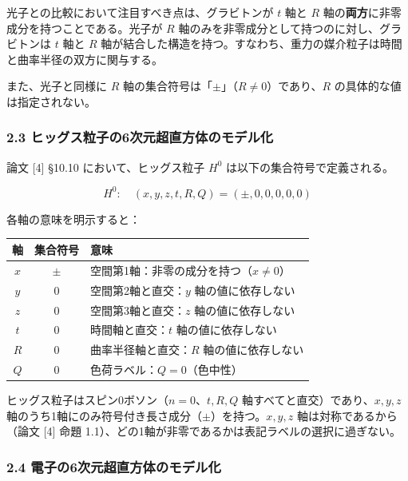 \documentclass[
  a4paper,11pt]{ltjsarticle}
\newcounter{none}
\theoremstyle{definition}
\theoremstyle{remark}
\begin{document}
光子との比較において注目すべき点は、グラビトンが \(t\) 軸と \(R\)
軸の\textbf{両方}に非零成分を持つことである。光子が \(R\)
軸のみを非零成分として持つのに対し、グラビトンは \(t\) 軸と \(R\)
軸が結合した構造を持つ。すなわち、重力の媒介粒子は時間と曲率半径の双方に関与する。

また、光子と同様に \(R\)
軸の集合符号は「\(\pm\)」（\(R \neq 0\)）であり、\(R\)
の具体的な値は指定されない。

\subsubsection{2.3
ヒッグス粒子の6次元超直方体のモデル化}\label{ux30d2ux30c3ux30b0ux30b9ux7c92ux5b50ux306e6ux6b21ux5143ux8d85ux76f4ux65b9ux4f53ux306eux30e2ux30c7ux30ebux5316}

論文 {[}4{]} §10.10 において、ヒッグス粒子 \(H^0\)
は以下の集合符号で定義される。

\[H^0: \quad (x, y, z, t, R, Q) = (\pm, 0, 0, 0, 0, 0)\]

各軸の意味を明示すると：

{\def\LTcaptype{none} %
\begin{longtable}[]{@{}ccl@{}}
\toprule\noalign{}
軸 & 集合符号 & 意味 \\
\midrule\noalign{}
\endhead
\bottomrule\noalign{}
\endlastfoot
\(x\) & \(\pm\) & 空間第1軸：非零の成分を持つ（\(x \neq 0\)） \\
\(y\) & \(0\) & 空間第2軸と直交：\(y\) 軸の値に依存しない \\
\(z\) & \(0\) & 空間第3軸と直交：\(z\) 軸の値に依存しない \\
\(t\) & \(0\) & 時間軸と直交：\(t\) 軸の値に依存しない \\
\(R\) & \(0\) & 曲率半径軸と直交：\(R\) 軸の値に依存しない \\
\(Q\) & \(0\) & 色荷ラベル：\(Q = 0\)（色中性） \\
\end{longtable}
}

ヒッグス粒子はスピン0ボソン（\(n = 0\)、\(t, R, Q\)
軸すべてと直交）であり、\(x, y, z\)
軸のうち1軸にのみ符号付き長さ成分（\(\pm\)）を持つ。\(x, y, z\)
軸は対称であるから（論文 {[}4{]} 命題
1.1）、どの1軸が非零であるかは表記ラベルの選択に過ぎない。

\subsubsection{2.4
電子の6次元超直方体のモデル化}\label{ux96fbux5b50ux306e6ux6b21ux5143ux8d85ux76f4ux65b9ux4f53ux306eux30e2ux30c7ux30ebux5316}
\end{document}

